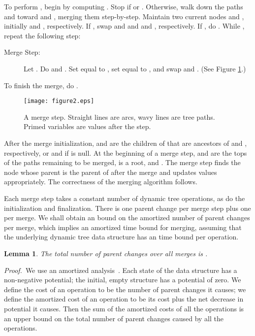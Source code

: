 \documentclass[twoside,leqno,twocolumn]{article}
\newtheorem{lemma}{Lemma}
\newcommand{\proof}{\noindent \emph{Proof.}\ }
\begin{document}
To perform , begin by computing .  Stop if  or .  Otherwise, walk down the paths  and  toward  and , merging them step-by-step.  Maintain two current nodes  and , initially  and , respectively.  If , swap  and  and  and , respectively.  If , do .  While , repeat the following step:

\begin{description}
\item[Merge Step:] Let .  Do  and . Set  equal to , set  equal to , and swap  and . (See Figure \ref{fig:topmost}.)
\end{description}

To finish the merge, do .

\begin{figure}
\addtolength{\abovecaptionskip}{-.5cm}
\begin{center}
\resizebox{0.85\textwidth}{!} {\texttt{[image: figure2.eps]}}\\
\end{center}
\caption{\label{fig:topmost} A merge step. Straight lines are arcs, wavy lines are tree paths. Primed variables are values after the step.}
\end{figure}


After the merge initialization,  and  are the children of  that are ancestors of  and , respectively, or  and  if  is null.  At the beginning of a merge step,   and  are the tops of the paths remaining to be merged,  is a root, and .  The merge step finds the node  whose parent is the parent of  after the merge and updates values appropriately.  The correctness of the merging algorithm follows.

Each merge step takes a constant number of dynamic tree operations, as do the initialization and finalization.  There is one parent change per merge step plus one per merge.  We shall obtain an  bound on the amortized number of parent changes per merge, which implies an  amortized time bound for merging, assuming that the underlying dynamic tree data structure has an  time bound per operation.

\begin{lemma}
\label{lemma:dyn-trees}
The total number of parent changes over all merges is .
\end{lemma}
\proof We use an amortized analysis~\cite{Tar85}.  Each state of the data structure has a non-negative potential; the initial, empty structure has a potential of zero.  We define the cost of an operation to be the number of parent changes it causes; we define the amortized cost of an operation to be its cost plus the net decrease in potential it causes.  Then the sum of the amortized costs of all the operations is an upper bound on the total number of parent changes caused by all the operations.
\end{document}
